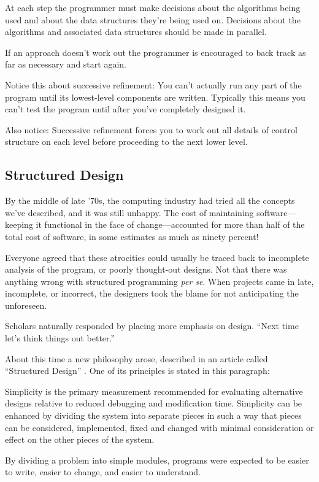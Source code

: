 At each step the programmer must make decisions about the algorithms
being used and about the data structures they're being used on.
Decisions about the algorithms%
and associated data structures should be made in parallel.

If an approach doesn't work out the programmer is encouraged to back
track as far as necessary and start again.

Notice this about successive refinement: You can't actually run any
part of the program until its lowest-level components are written.
Typically this means you can't test the program until after you've
completely designed it. 

Also notice: Successive refinement forces you to work out
all details of control structure on each level before proceeding
to the next lower level.%
%


\subsection{Structured Design}

By the middle of late '70s, the computing industry had tried all the
concepts we've described, and it was still unhappy. The cost of
maintaining software---keeping it functional in the face of
change---accounted for more than half of the total cost of software,
in some estimates as much as ninety percent!

Everyone agreed that these atrocities could usually be traced back to
incomplete analysis of the program, or poorly thought-out designs.
Not that there was anything wrong with structured programming
\emph{per se}. When projects came in late, incomplete, or incorrect,
the designers took the blame for not anticipating the unforeseen. 

Scholars naturally responded by placing more emphasis on design.
``Next time let's think things out better.''

About this time a new philosophy arose, described in an article called
``Structured Design'' \cite{stevens74-1}. One of its principles is
stated in this paragraph: 

\begin{tfquot}
Simplicity is the primary measurement recommended for evaluating
alternative designs relative to reduced debugging and modification
time. Simplicity can be enhanced by dividing the system into separate
pieces in such a way that pieces can be considered, implemented, fixed
and changed with minimal consideration or effect on the other pieces
of the system.
\end{tfquot}
By dividing a problem into simple modules, programs were expected to
be easier to write, easier to change, and easier to understand.

